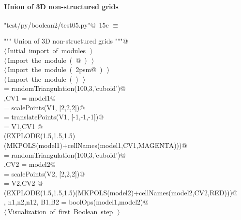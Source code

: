 \documentclass[11pt,oneside]{article}	%
\begin{document}
\paragraph{Union of 3D non-structured grids}

\begin{flushleft} \small
\begin{minipage}{\linewidth} \label{scrap30}
\protect{}\verb@"test/py/boolean2/test05.py"@\nobreak\ {\footnotesize 15e }$\equiv$
\vspace{-1ex}
\begin{list}{}{} \item
\mbox{}\verb@""" Union of 3D non-structured grids """@\\
\mbox{}\verb@@\hbox{$\langle\,$Initial import of modules\nobreak\ {\footnotesize {}}$\,\rangle$}\verb@@\\
\mbox{}\verb@@\hbox{$\langle\,$Import the module\nobreak\ ({\footnotesize {}\label{scrap31}
 }\mbox{}@ ) {\footnotesize {}}$\,\rangle$}\verb@@\\
\mbox{}\verb@@\hbox{$\langle\,$Import the module\nobreak\ ({\footnotesize {}\label{scrap32}
 }\mbox{}\verb@lar2psm@ ) {\footnotesize {}}$\,\rangle$}\verb@@\\
\mbox{}\verb@@\hbox{$\langle\,$Import the module\nobreak\ ({\footnotesize {}\label{scrap33}
 }\mbox{}\verb@myfont@ ) {\footnotesize {}}$\,\rangle$}\verb@@\\
\mbox{} = randomTriangulation(100,3,'cuboid')@\\
\mbox{},CV1 = model1@\\
\mbox{} = scalePoints(V1, [2,2,2])@\\
\mbox{} = translatePoints(V1, [-1,-1,-1])@\\
\mbox{} = V1,CV1 @\\
\mbox{}\verb@VIEW(EXPLODE(1.5,1.5,1.5)(MKPOLS(model1)+cellNames(model1,CV1,MAGENTA)))@\\
\mbox{} = randomTriangulation(100,3,'cuboid')@\\
\mbox{},CV2 = model2@\\
\mbox{} = scalePoints(V2, [2,2,2])@\\
\mbox{} = V2,CV2 @\\
\mbox{}\verb@VIEW(EXPLODE(1.5,1.5,1.5)(MKPOLS(model2)+cellNames(model2,CV2,RED)))@\\
\mbox{}\verb@V, n1,n2,n12, B1,B2 = boolOps(model1,model2)@\\
\mbox{}\verb@@\hbox{$\langle\,$Visualization of first Boolean step\nobreak\ {\footnotesize {}}$\,\rangle$}\verb@@\\
\mbox{}\verb@@{\NWsep}
\end{list}
\vspace{-2ex}
\end{minipage}\\[4ex]
\end{flushleft}
\end{document}
